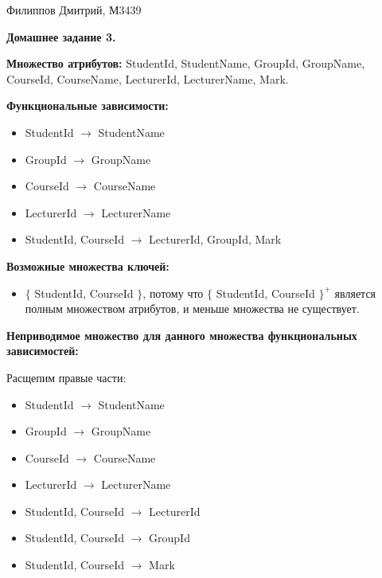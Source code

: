 \documentclass[11pt,a4paper,oneside]{article}
\begin{document}
\renewcommand{\t}[1]{\mbox{\texttt{#1}}}
\newcommand{\s}[1]{\mbox{``\t{#1}''}}
\newcommand{\eps}{\varepsilon}
\renewcommand{\phi}{\varphi}
\newcommand{\plainhat}{{\char 94}}

\newcommand{\Z}{\mathbb{Z}}
\newcommand{\w}[1]{``\t{#1}''}




Филиппов Дмитрий, М3439
\newline

\begin{LARGE} \textbf{Домашнее задание 3.} \end{LARGE}
\newline

\textbf{Множество атрибутов:} StudentId, StudentName, GroupId, GroupName, CourseId, CourseName, LecturerId, LecturerName, Mark.
\newline

\textbf{Функциональные зависимости:}
\begin{itemize}
\item StudentId $\rightarrow$ StudentName
\item GroupId $\rightarrow$ GroupName
\item CourseId $\rightarrow$ CourseName
\item LecturerId $\rightarrow$ LecturerName
\item StudentId, CourseId $\rightarrow$ LecturerId, GroupId, Mark
\end{itemize}

\textbf{Возможные множества ключей:}
\begin{itemize}
\item $\{$ StudentId, CourseId $\}$, потому что $\{$ StudentId, CourseId $\}^+$ является полным множеством атрибутов, и меньше множества не существует.
\end{itemize}

\textbf{Неприводимое множество для данного множества функциональных зависимостей:}

Расщепим правые части:

\begin{itemize}
\item StudentId $\rightarrow$ StudentName
\item GroupId $\rightarrow$ GroupName
\item CourseId $\rightarrow$ CourseName
\item LecturerId $\rightarrow$ LecturerName
\item StudentId, CourseId $\rightarrow$ LecturerId
\item StudentId, CourseId $\rightarrow$ GroupId
\item StudentId, CourseId $\rightarrow$ Mark
\end{itemize}
\end{document}
